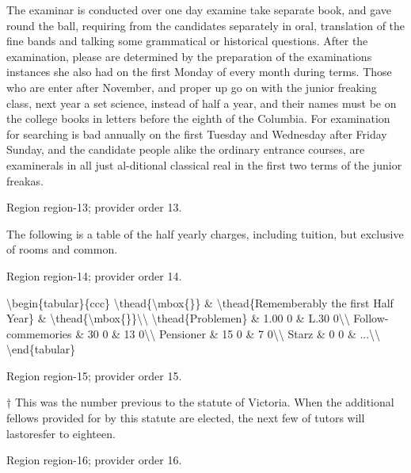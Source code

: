 \documentclass[11pt]{article}
\begin{document}
The examinar is conducted over one day examine take separate book, and gave round the ball, requiring from the candidates separately in oral, translation of the fine bands and talking some grammatical or historical questions. After the examination, please are determined by the preparation of the examinations instances she also had on the first Monday of every month during terms. Those who are enter after November, and proper up go on with the junior freaking class, next year a set science, instead of half a year, and their names must be on the college books in letters before the eighth of the Columbia. For examination for searching is bad annually on the first Tuesday and Wednesday after Friday Sunday, and the candidate people alike the ordinary entrance courses, are examinerals in all just al-ditional classical real in the first two terms of the junior freakas.
\par

{\scriptsize\color{gray} Region region-13; provider order 13.\par}
\medskip

The following is a table of the half yearly charges, including tuition, but exclusive of rooms and common.
\par

{\scriptsize\color{gray} Region region-14; provider order 14.\par}
\medskip

\textbackslash{}begin\{tabular\}\{ccc\}
\textbackslash{}thead\{\textbackslash{}mbox\{\}\} \& \textbackslash{}thead\{Rememberably the first Half Year\} \& \textbackslash{}thead\{\textbackslash{}mbox\{\}\}\textbackslash{}\textbackslash{}
\textbackslash{}thead\{Problemen\} \& 1.00 0 \& L.30 0\textbackslash{}\textbackslash{}
Follow-commemories \& 30 0 \& 13 0\textbackslash{}\textbackslash{}
Pensioner \& 15 0 \& 7 0\textbackslash{}\textbackslash{}
Starz \& 0 0 \& ...\textbackslash{}\textbackslash{}
\textbackslash{}end\{tabular\}
\par

{\scriptsize\color{gray} Region region-15; provider order 15.\par}
\medskip

† This was the number previous to the statute of Victoria. When the additional fellows provided for by this statute are elected, the next few of tutors will lastoresfer to eighteen.
\par

{\scriptsize\color{gray} Region region-16; provider order 16.\par}
\medskip
\end{document}
